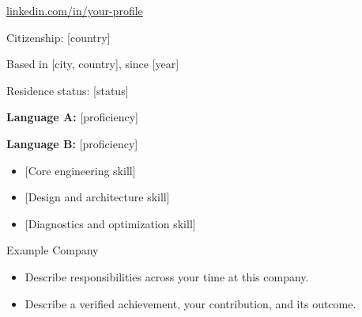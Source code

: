 
\renewcommand{\cvphotofile}{content/example-photo.jpg}
\renewcommand{\cvapplicationnote}{%
  Applying for the [role] position at [company]. Interested in [engineering challenge]
  and the opportunity to contribute experience in [relevant expertise].
}
\begin{cvheader}
\vspace{\baselineskip}
\cvphonecontact
\cvemailcontact
\href{https://www.linkedin.com/in/your-profile}{linkedin.com/in/your-profile}\par
\end{cvheader}

Citizenship: [country]\par
Based in [city, country], since [year]\par
Residence status: [status]

\textbf{Language A:} [proficiency]\par
\textbf{Language B:} [proficiency]

\begin{itemize}
  \item {[Core engineering skill]}
  \item {[Design and architecture skill]}
  \item {[Diagnostics and optimization skill]}
\end{itemize}

\begin{cvcontinued}{Example Company}
\begin{cvcompanytree}\raggedright
\begin{itemize}
  \item Describe responsibilities across your time at this company.
  \item Describe a verified achievement, your contribution, and its outcome.
\end{itemize}
\end{cvcompanytree}
\end{cvcontinued}

